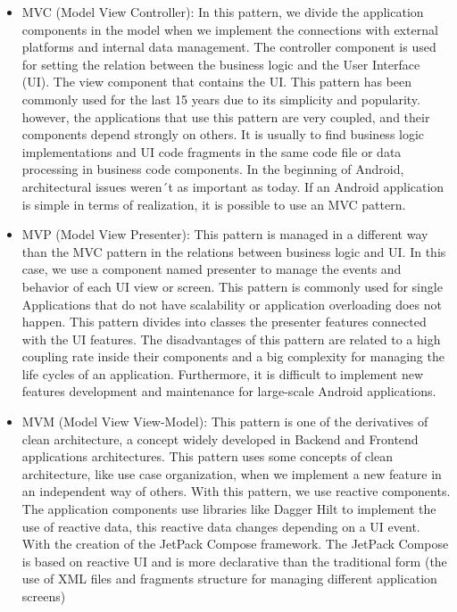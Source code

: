 \begin{itemize}
	\item MVC (Model View Controller): In this pattern, we divide the application components in the model when we implement the connections with external platforms and internal data management. The controller component is used for setting the relation between the business logic and the User Interface (UI). The view component that contains the UI. This pattern has been commonly used for the last 15 years due to its simplicity and popularity. however, the applications that use this pattern are very coupled, and their components depend strongly on others. It is usually to find business logic implementations and UI code fragments in the same code file or data processing in business code components.  In the beginning of Android, architectural issues weren´t as important as today. If an Android application is simple in terms of realization, it is possible to use an MVC pattern.
	
	\item MVP (Model View Presenter): This pattern is managed in a different way than the MVC pattern in the relations between business logic and UI. In this case, we use a component named presenter to manage the events and behavior of each UI view or screen. This pattern is commonly used for single Applications that do not have scalability or application overloading does not happen. This pattern divides into classes the presenter features connected with the UI features. The disadvantages of this pattern are related to a high coupling rate inside their components and a big complexity for managing the life cycles of an application. Furthermore, it is difficult to implement new features development and maintenance for large-scale Android applications.
	
	\item MVM (Model View View-Model): This pattern is one of the derivatives of clean architecture, a concept widely developed in Backend and Frontend applications architectures. This pattern uses some concepts of clean architecture, like use case organization, when we implement a new feature in an independent way of others. With this pattern, we use reactive components. The application components use libraries like Dagger Hilt to implement the use of reactive data, this reactive data changes depending on a UI event. With the creation of the JetPack Compose framework. The JetPack Compose is based on reactive UI and is more declarative than the traditional form (the use of XML files and fragments structure for managing different application screens)
\end{itemize}

